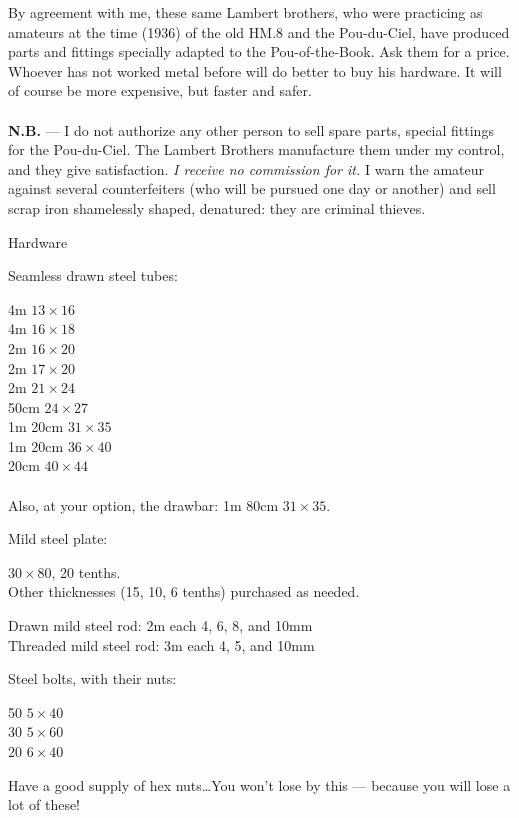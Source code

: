 \documentclass{book}
\begin{document}
{{  By agreement with me, these same Lambert brothers, who were
  practicing as amateurs at the time (1936) of the old HM.8 and the
  Pou-du-Ciel, have produced parts and fittings specially adapted to
  the Pou-of-the-Book. Ask them for a price. Whoever has not worked
  metal before will do better to buy his hardware. It will of course
  be more expensive, but faster and safer.\\
  \\
  \textbf{N.B.} --- I do not authorize any other person to sell spare
  parts, special fittings for the Pou-du-Ciel. The Lambert Brothers
  manufacture them under my control, and they give satisfaction. \textit{I
  receive no commission for it.} I warn the amateur against several
  counterfeiters (who will be pursued one day or another) and sell
  scrap iron shamelessly shaped, denatured: they are criminal thieves.

\item{Hardware}

  Seamless drawn steel tubes:

  4m $13\times16$\\
  4m $16\times18$\\
  2m $16\times20$\\
  2m $17\times20$\\
  2m $21\times24$\\
  50cm $24\times27$\\
  1m 20cm $31\times35$\\
  1m 20cm $36\times40$\\
  20cm $40\times44$\\
  \\
  Also, at your option, the drawbar: 1m 80cm $31\times35$.

  Mild steel plate:

  $30\times80$, 20 tenths.\\
  Other thicknesses (15, 10, 6 tenths) purchased as needed.

  Drawn mild steel rod: 2m each 4, 6, 8, and 10mm\\
  Threaded mild steel rod: 3m each 4, 5, and 10mm

  Steel bolts, with their nuts:

  50 $5\times40$\\
  30 $5\times 60$\\
  20 $6\times40$

  Have a good supply of hex nuts\ldots You won't lose by this ---
  because you will lose a lot of these!

}}
\end{document}
